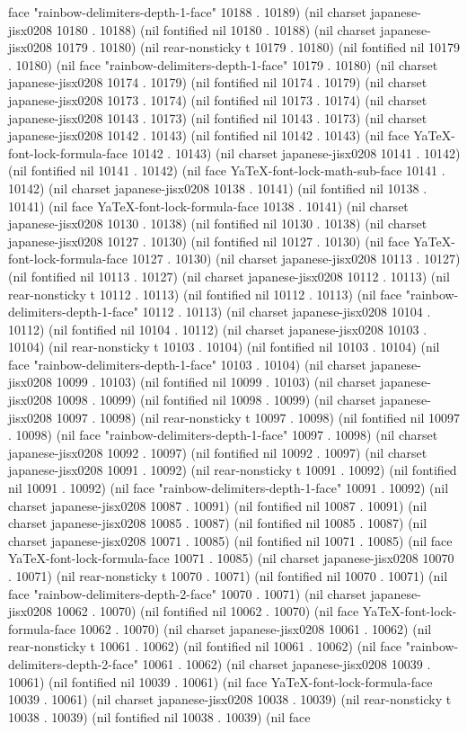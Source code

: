face "rainbow-delimiters-depth-1-face" 10188 . 10189) (nil charset japanese-jisx0208 10180 . 10188) (nil fontified nil 10180 . 10188) (nil charset japanese-jisx0208 10179 . 10180) (nil rear-nonsticky t 10179 . 10180) (nil fontified nil 10179 . 10180) (nil face "rainbow-delimiters-depth-1-face" 10179 . 10180) (nil charset japanese-jisx0208 10174 . 10179) (nil fontified nil 10174 . 10179) (nil charset japanese-jisx0208 10173 . 10174) (nil fontified nil 10173 . 10174) (nil charset japanese-jisx0208 10143 . 10173) (nil fontified nil 10143 . 10173) (nil charset japanese-jisx0208 10142 . 10143) (nil fontified nil 10142 . 10143) (nil face YaTeX-font-lock-formula-face 10142 . 10143) (nil charset japanese-jisx0208 10141 . 10142) (nil fontified nil 10141 . 10142) (nil face YaTeX-font-lock-math-sub-face 10141 . 10142) (nil charset japanese-jisx0208 10138 . 10141) (nil fontified nil 10138 . 10141) (nil face YaTeX-font-lock-formula-face 10138 . 10141) (nil charset japanese-jisx0208 10130 . 10138) (nil fontified nil 10130 . 10138) (nil charset japanese-jisx0208 10127 . 10130) (nil fontified nil 10127 . 10130) (nil face YaTeX-font-lock-formula-face 10127 . 10130) (nil charset japanese-jisx0208 10113 . 10127) (nil fontified nil 10113 . 10127) (nil charset japanese-jisx0208 10112 . 10113) (nil rear-nonsticky t 10112 . 10113) (nil fontified nil 10112 . 10113) (nil face "rainbow-delimiters-depth-1-face" 10112 . 10113) (nil charset japanese-jisx0208 10104 . 10112) (nil fontified nil 10104 . 10112) (nil charset japanese-jisx0208 10103 . 10104) (nil rear-nonsticky t 10103 . 10104) (nil fontified nil 10103 . 10104) (nil face "rainbow-delimiters-depth-1-face" 10103 . 10104) (nil charset japanese-jisx0208 10099 . 10103) (nil fontified nil 10099 . 10103) (nil charset japanese-jisx0208 10098 . 10099) (nil fontified nil 10098 . 10099) (nil charset japanese-jisx0208 10097 . 10098) (nil rear-nonsticky t 10097 . 10098) (nil fontified nil 10097 . 10098) (nil face "rainbow-delimiters-depth-1-face" 10097 . 10098) (nil charset japanese-jisx0208 10092 . 10097) (nil fontified nil 10092 . 10097) (nil charset japanese-jisx0208 10091 . 10092) (nil rear-nonsticky t 10091 . 10092) (nil fontified nil 10091 . 10092) (nil face "rainbow-delimiters-depth-1-face" 10091 . 10092) (nil charset japanese-jisx0208 10087 . 10091) (nil fontified nil 10087 . 10091) (nil charset japanese-jisx0208 10085 . 10087) (nil fontified nil 10085 . 10087) (nil charset japanese-jisx0208 10071 . 10085) (nil fontified nil 10071 . 10085) (nil face YaTeX-font-lock-formula-face 10071 . 10085) (nil charset japanese-jisx0208 10070 . 10071) (nil rear-nonsticky t 10070 . 10071) (nil fontified nil 10070 . 10071) (nil face "rainbow-delimiters-depth-2-face" 10070 . 10071) (nil charset japanese-jisx0208 10062 . 10070) (nil fontified nil 10062 . 10070) (nil face YaTeX-font-lock-formula-face 10062 . 10070) (nil charset japanese-jisx0208 10061 . 10062) (nil rear-nonsticky t 10061 . 10062) (nil fontified nil 10061 . 10062) (nil face "rainbow-delimiters-depth-2-face" 10061 . 10062) (nil charset japanese-jisx0208 10039 . 10061) (nil fontified nil 10039 . 10061) (nil face YaTeX-font-lock-formula-face 10039 . 10061) (nil charset japanese-jisx0208 10038 . 10039) (nil rear-nonsticky t 10038 . 10039) (nil fontified nil 10038 . 10039) (nil face 